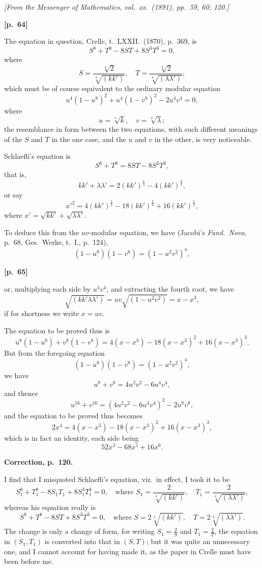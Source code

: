 \documentclass[11pt,a4paper]{book}
\begin{document}
\noindent\textit{[From the Messenger of Mathematics, vol.\ xx.\ (1891), pp.\ 59, 60; 120.]}

\vspace{0.5em}
\noindent\textbf{[p.\ 64]}

The equation in question, Crelle, t.\ LXXII.\ (1870), p.\ 369, is
$$
S^8 + T^8 - 8ST + 8S^3 T^3 = 0,
$$
where
$$
S = \frac{\sqrt[4]{2}}{\sqrt[4]{(kk')}}, \quad T = \frac{\sqrt[4]{2}}{\sqrt[4]{(\lambda\lambda')}},
$$
which must be of course equivalent to the ordinary modular equation
$$
u^4(1 - u^8)^2 + u^4(1 - v^8)^2 - 2u^4 v^4 = 0,
$$
where
$$
u = \sqrt[4]{k}, \quad v = \sqrt[4]{\lambda};
$$
the resemblance in form between the two equations, with such different meanings of the $S$ and $T$ in the one case, and the $u$ and $v$ in the other, is very noticeable.

Schlaefli's equation is
$$
S^8 + T^8 = 8ST - 8S^3 T^3,
$$
that is,
$$
kk' + \lambda\lambda' = 2(kk')^{\frac{1}{4}} - 4(kk')^{\frac{3}{4}},
$$
or say
$$
x'^2 = 4(kk')^{\frac{1}{4}} - 18(kk')^{\frac{3}{4}} + 16(kk')^{\frac{5}{4}},
$$
where $x' = \sqrt{kk'} + \sqrt{\lambda\lambda'}$.

To deduce this from the $uv$-modular equation, we have (Jacobi's \textit{Fund.\ Nova}, p.\ 68, Ges.\ Werke, t.\ I., p.\ 124),
$$
(1 - u^8)(1 - v^8) = (1 - u^2 v^2)^4,
$$

\vspace{0.5em}
\noindent\textbf{[p.\ 65]}

or, multiplying each side by $u^4 v^4$, and extracting the fourth root, we have
$$
\sqrt{(kk'\lambda\lambda')} = uv\sqrt{(1 - u^2 v^2)} = x - x^3,
$$
if for shortness we write $x = uv$.

The equation to be proved thus is
$$
u^8(1 - u^8) + v^8(1 - v^8) = 4(x - x^3) - 18(x - x^3)^2 + 16(x - x^3)^3.
$$
But from the foregoing equation
$$
(1 - u^8)(1 - v^8) = (1 - u^2 v^2)^4,
$$
we have
$$
u^8 + v^8 = 4u^2 v^2 - 6u^4 v^4,
$$
and thence
$$
u^{16} + v^{16} = (4u^2 v^2 - 6u^4 v^4)^2 - 2u^8 v^8,
$$
and the equation to be proved thus becomes
$$
2x^4 = 4(x - x^3) - 18(x - x^3)^2 + 16(x - x^3)^3,
$$
which is in fact an identity, each side being
$$
52x^3 - 68x^5 + 16x^6.
$$

\vspace{1em}
\noindent\textbf{Correction, p.\ 120.}

I find that I misquoted Schlaefli's equation, viz.\ in effect, I took it to be
$$
S_1^8 + T_1^8 - 8S_1 T_1 + 8S_1^3 T_1^3 = 0, \quad \text{where } S_1 = \frac{2}{\sqrt[4]{(kk')}}, \quad T_1 = \frac{2}{\sqrt[4]{(\lambda\lambda')}},
$$
whereas his equation really is
$$
S^8 + T^8 - 8ST + 8S^3 T^3 = 0, \quad \text{where } S = 2\sqrt[4]{(kk')}, \quad T = 2\sqrt[4]{(\lambda\lambda')}.
$$
The change is only a change of form, for writing $S_1 = \frac{2}{S}$ and $T_1 = \frac{2}{T}$, the equation in $(S_1, T_1)$ is converted into that in $(S, T)$; but it was quite an unnecessary one, and I cannot account for having made it, as the paper in Crelle must have been before me.
\end{document}
